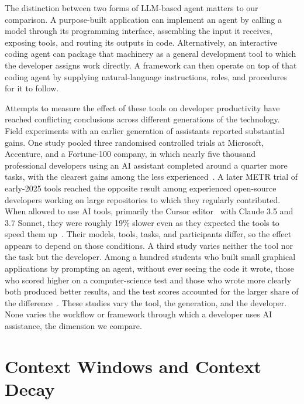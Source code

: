 The distinction between two forms of LLM-based agent matters to our comparison. A purpose-built application can implement an agent by calling a model through its programming interface, assembling the input it receives, exposing tools, and routing its outputs in code. Alternatively, an interactive coding agent can package that machinery as a general development tool to which the developer assigns work directly. A framework can then operate on top of that coding agent by supplying natural-language instructions, roles, and procedures for it to follow.

Attempts to measure the effect of these tools on developer productivity have reached conflicting conclusions across different generations of the technology. Field experiments with an earlier generation of assistants reported substantial gains. One study pooled three randomised controlled trials at Microsoft, Accenture, and a Fortune-100 company, in which nearly five thousand professional developers using an AI assistant completed around a quarter more tasks, with the clearest gains among the less experienced~\cite{cui2026genai}. A later METR trial of early-2025 tools reached the opposite result among experienced open-source developers working on large repositories to which they regularly contributed. When allowed to use AI tools, primarily the Cursor editor~\cite{anysphere2026cursor} with Claude 3.5 and 3.7 Sonnet, they were roughly 19\% slower even as they expected the tools to speed them up~\cite{becker2025metr}. Their models, tools, tasks, and participants differ, so the effect appears to depend on those conditions. A third study varies neither the tool nor the task but the developer. Among a hundred students who built small graphical applications by prompting an agent, without ever seeing the code it wrote, those who scored higher on a computer-science test and those who wrote more clearly both produced better results, and the test scores accounted for the larger share of the difference~\cite{thorgeirsson2026vibeskills}. These studies vary the tool, the generation, and the developer. None varies the workflow or framework through which a developer uses AI assistance, the dimension we compare.

\section{Context Windows and Context Decay}
\label{sec:background-context-windows-and-context-decay}

